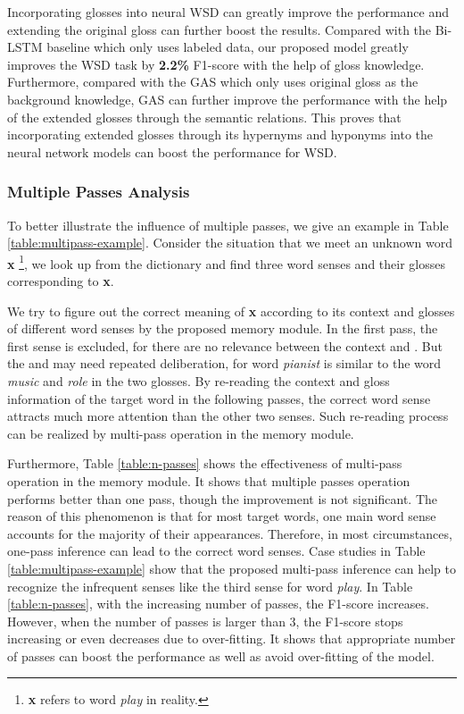 \documentclass[11pt,a4paper]{article}
\begin{document}
Incorporating glosses into neural WSD can greatly improve the performance and extending the original gloss can further boost the results.
Compared with the Bi-LSTM baseline which only uses labeled data, our proposed model greatly improves the WSD task by \textbf{2.2\%} F1-score with the help of gloss knowledge.
Furthermore, compared with the GAS which only uses original gloss as the background knowledge, GAS can further improve the performance with the help of the extended glosses through the semantic relations.
This proves that incorporating extended glosses through its hypernyms and hyponyms into the neural network models can boost the performance for WSD.

\subsubsection{Multiple Passes Analysis} \label{Multi-pass}
To better illustrate the influence of multiple passes, we give an example in Table \ref{table:multipass-example}.
Consider the situation that we meet an unknown word \textbf{x} \footnote{\textbf{x} refers to word {\em play} in reality.}, we look up from the dictionary and find three word senses and their glosses corresponding to \textbf{x}.

We try to figure out the correct meaning of \textbf{x} according to its context and glosses of different word senses by the proposed memory module.
In the first pass, the first sense is excluded, for there are no relevance between the context and . But the  and  may need repeated deliberation, for word {\em pianist} is similar to the word {\em music} and {\em role} in the two glosses.
By re-reading the context and gloss information of the target word in the following passes, the correct word sense  attracts much more attention than the other two senses.
Such re-reading process can be realized by multi-pass operation in the memory module.


Furthermore, Table \ref{table:n-passes} shows the effectiveness of multi-pass operation in the memory module.
It shows that multiple passes operation performs better than one pass, though the improvement is not significant.
The reason of this phenomenon is that for most target words, one main word sense accounts for the majority of their appearances.
Therefore, in most circumstances, one-pass inference can lead to the correct word senses.
Case studies in Table \ref{table:multipass-example} show that the proposed multi-pass inference can help to recognize the infrequent senses like the third sense for word {\em play}.
In Table \ref{table:n-passes}, with the increasing number of passes, the F1-score increases.
However, when the number of passes is larger than 3, the F1-score stops increasing or even decreases due to over-fitting.
It shows that appropriate number of passes can boost the performance as well as avoid over-fitting of the model.
\end{document}

